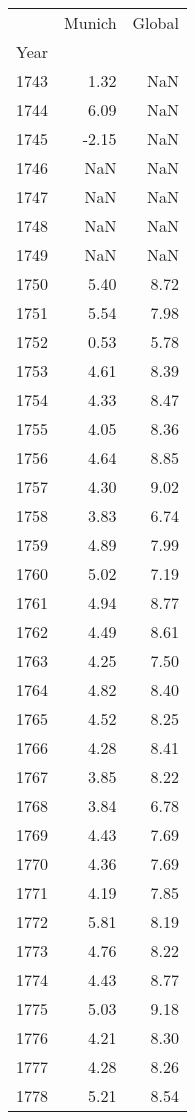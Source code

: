 \begin{tabular}{lrr}
\toprule
{} &  Munich &  Global \\
Year &         &         \\
\midrule
1743 &    1.32 &     NaN \\
1744 &    6.09 &     NaN \\
1745 &   -2.15 &     NaN \\
1746 &     NaN &     NaN \\
1747 &     NaN &     NaN \\
1748 &     NaN &     NaN \\
1749 &     NaN &     NaN \\
1750 &    5.40 &    8.72 \\
1751 &    5.54 &    7.98 \\
1752 &    0.53 &    5.78 \\
1753 &    4.61 &    8.39 \\
1754 &    4.33 &    8.47 \\
1755 &    4.05 &    8.36 \\
1756 &    4.64 &    8.85 \\
1757 &    4.30 &    9.02 \\
1758 &    3.83 &    6.74 \\
1759 &    4.89 &    7.99 \\
1760 &    5.02 &    7.19 \\
1761 &    4.94 &    8.77 \\
1762 &    4.49 &    8.61 \\
1763 &    4.25 &    7.50 \\
1764 &    4.82 &    8.40 \\
1765 &    4.52 &    8.25 \\
1766 &    4.28 &    8.41 \\
1767 &    3.85 &    8.22 \\
1768 &    3.84 &    6.78 \\
1769 &    4.43 &    7.69 \\
1770 &    4.36 &    7.69 \\
1771 &    4.19 &    7.85 \\
1772 &    5.81 &    8.19 \\
1773 &    4.76 &    8.22 \\
1774 &    4.43 &    8.77 \\
1775 &    5.03 &    9.18 \\
1776 &    4.21 &    8.30 \\
1777 &    4.28 &    8.26 \\
1778 &    5.21 &    8.54 \\

\end{tabular}
